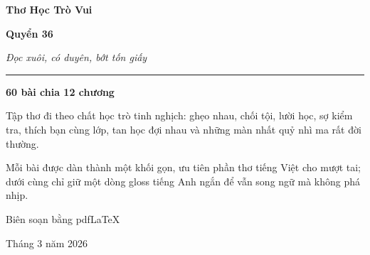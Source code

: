 \thispagestyle{empty}
\begin{center}
\vspace*{2.3cm}
{\fontsize{27}{32}\selectfont\bfseries\color{titlecolor} Thơ Học Trò Vui\par}
\vspace{0.35cm}
{\Large\bfseries Quyển 36\par}
\vspace{0.55cm}
{\fontsize{17}{22}\selectfont\itshape Đọc xuôi, có duyên, bớt tốn giấy\par}
\vspace{0.9cm}
\textcolor{softline}{\rule{0.8\linewidth}{0.9pt}}\par
\vspace{0.7cm}
{\large\bfseries\color{chapterline} 60 bài chia 12 chương\par}
\vspace{0.35cm}
\begin{minipage}{0.84\linewidth}
\centering
{\normalsize Tập thơ đi theo chất học trò tinh nghịch: ghẹo nhau, chối tội, lười học, sợ kiểm tra, thích bạn cùng lớp, tan học đợi nhau và những màn nhất quỷ nhì ma rất đời thường.\par}
\end{minipage}
\vspace{0.95cm}
\begin{minipage}{0.8\linewidth}
\centering
{\small Mỗi bài được dàn thành một khối gọn, ưu tiên phần thơ tiếng Việt cho mượt tai; dưới cùng chỉ giữ một dòng gloss tiếng Anh ngắn để vẫn song ngữ mà không phá nhịp.\par}
\end{minipage}
\vfill
{\small Biên soạn bằng pdfLaTeX\par}
\vspace{0.45cm}
{\small Tháng 3 năm 2026\par}
\end{center}
\clearpage
